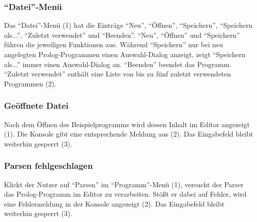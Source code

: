 \documentclass[parskip=full,11pt,twoside]{scrartcl}
\begin{document}
\subsubsection{\enquote{Datei}-Menü}

\begin{minipage}{\linewidth}
\end{minipage}

Das \enquote{Datei}-Menü (1) hat die Einträge \enquote{Neu}, \enquote{Öffnen}, \enquote{Speichern}, \enquote{Speichern als...}, \enquote{Zuletzt verwendet} und \enquote{Beenden}.
\enquote{Neu}, \enquote{Öffnen} und \enquote{Speichern} führen die jeweiligen Funktionen aus.
Während \enquote{Speichern} nur bei neu angelegten Prolog-Programmen einen Auswahl-Dialog anzeigt, zeigt \enquote{Speichern als...} immer einen Auswahl-Dialog an.
\enquote{Beenden} beendet das Programm.
\enquote{Zuletzt verwendet} enthält eine Liste von bis zu fünf zuletzt verwendeten Programmen (2).

\subsubsection{Geöffnete Datei}

\begin{minipage}{\linewidth}
\end{minipage}

Nach dem Öffnen des Beispielprogramms wird dessen Inhalt im Editor angezeigt (1).
Die Konsole gibt eine entsprechende Meldung aus (2).
Das Eingabefeld bleibt weiterhin gesperrt (3).

\subsubsection{Parsen fehlgeschlagen}

\begin{minipage}{\linewidth}
\end{minipage}

Klickt der Nutzer auf \enquote{Parsen} im \enquote{Programm}-Menü (1), versucht der Parser das Prolog-Programm im Editor zu verarbeiten.
Stößt er dabei auf Fehler, wird eine Fehlermeldung in der Konsole angezeigt (2).
Das Eingabefeld bleibt weiterhin gesperrt (3).
\end{document}
